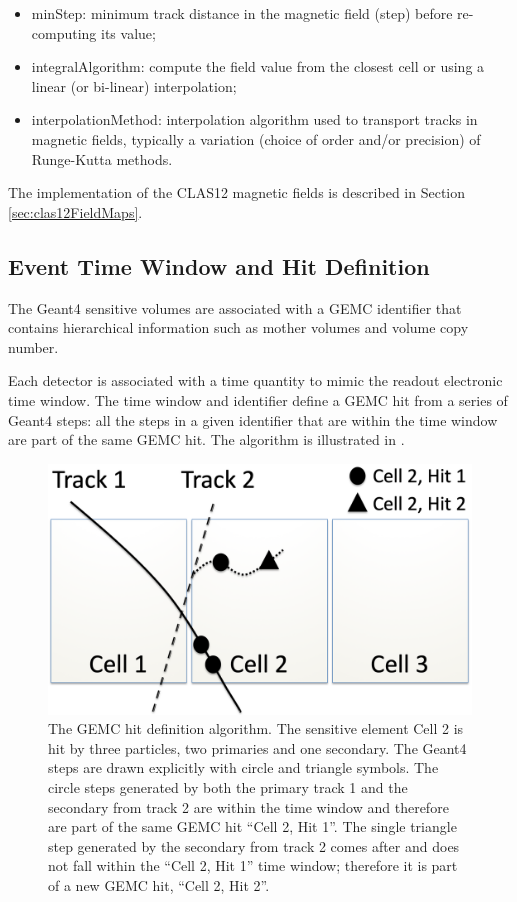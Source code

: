\begin{itemize}
	\item minStep: minimum track distance in the magnetic field (step) before re-computing its value;
	\item integralAlgorithm: compute the field value from the closest cell or using a linear (or bi-linear) interpolation;
	\item interpolationMethod: interpolation algorithm used to transport tracks in magnetic fields, typically
		  a variation (choice of order and/or precision) of Runge-Kutta \cite{rungeKutta} methods.
\end{itemize}

The implementation of the CLAS12 magnetic fields is described in Section \ref{sec:clas12FieldMaps}.

\subsection{Event Time Window and Hit Definition}

The Geant4 sensitive volumes are associated with a GEMC identifier that contains hierarchical information such as mother volumes
and volume copy number.

Each detector is associated with a time quantity to mimic the readout electronic time window. The time window and identifier
define a GEMC hit from a series of Geant4 steps: all the steps in a given identifier that are within the time window
are part of the same GEMC hit. The algorithm is illustrated in .

\begin{figure}
	\centering
	\includegraphics[width=0.99\columnwidth,keepaspectratio]{img/hitDefinition.png}
	\caption{The GEMC hit definition algorithm. The sensitive element Cell 2 is hit by three particles, two primaries and one secondary.
             The Geant4 steps are drawn explicitly with circle and triangle symbols. The circle steps generated by both the primary track 1 and the secondary
             from track 2 are within the time window and therefore are part of the same GEMC hit ``Cell 2, Hit 1''.
             The single triangle step generated by the secondary from track 2 comes after and does not fall within the ``Cell 2, Hit 1''
             time window; therefore it is part of a new GEMC hit, ``Cell 2, Hit 2''.}
	\label{fig:hitDefinition}
\end{figure}


